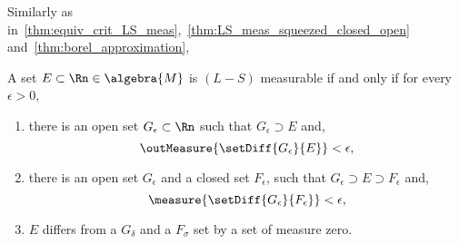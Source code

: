 Similarly as in~\ref{thm:equiv_crit_LS_meas},~\ref{thm:LS_meas_squeezed_closed_open}
and~\ref{thm:borel_approximation},
\begin{Theorem}[name=$(L-S)$ Measurability in $\Rn$]\label{thm:equiv_Lebesgue_meas_rn}
A set $E \subset \Rn \in \algebra{M}$ is $(L-S)$ measurable if and only if for every 
$\epsilon > 0$,
    \begin{enumerate}
	\item
	    there is an open set $G_{\epsilon} \subset \Rn$ such that
	    $G_{\epsilon} \supset E$ and,
	    \[\outMeasure{\setDiff{G_{\epsilon}}{E}} < \epsilon,\]
	\item
	    there is an open set $G_{\epsilon}$ and a closed set $F_{\epsilon}$, such that
	    $G_{\epsilon}\supset E \supset F_{\epsilon}$ and,
	    \[\measure{\setDiff{G_{\epsilon}}{F_{\epsilon}}} < \epsilon,\]
	\item
	    $E$ differs from a $G_{\delta}$ and a $F_{\sigma}$ set by a set of measure zero.
    \end{enumerate}
\end{Theorem}

